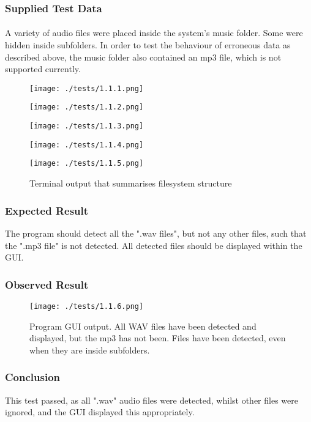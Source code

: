 \subsubsection{Supplied Test Data}
\paragraph{}
A variety of audio files were placed inside the system's music folder. Some were hidden inside subfolders. In order to test the behaviour of erroneous data as described above, the music folder also contained an mp3 file, which is not supported currently.

\begin{figure}[H]
	\texttt{[image: ./tests/1.1.1.png]}
\end{figure}
\begin{figure}[H]
	\texttt{[image: ./tests/1.1.2.png]}
\end{figure}
\begin{figure}[H]
	\texttt{[image: ./tests/1.1.3.png]}
\end{figure}
\begin{figure}[H]
	\texttt{[image: ./tests/1.1.4.png]}
\end{figure}
\begin{figure}[H]
	\texttt{[image: ./tests/1.1.5.png]}
	\caption{Terminal output that summarises filesystem structure}
\end{figure}

\subsubsection{Expected Result}
The program should detect all the ".wav files", but not any other files, such that the ".mp3 file" is not detected. All detected files should be displayed within the GUI.

\subsubsection{Observed Result}
\begin{figure}[H]
	\texttt{[image: ./tests/1.1.6.png]}
	\caption{Program GUI output. All WAV files have been detected and displayed, but the mp3 has not been. Files have been detected, even when they are inside subfolders.}
\end{figure}

\subsubsection{Conclusion}
This test passed, as all ".wav" audio files were detected, whilst other files were ignored, and the GUI displayed this appropriately.


